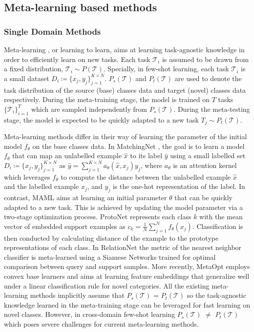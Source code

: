 \documentclass[runningheads]{llncs}
\begin{document}
\subsection{Meta-learning based methods}

\subsubsection{Single Domain Methods}
Meta-learning \cite{finn2017model,ravi2016optimization}, or learning to learn, aims at learning task-agnostic knowledge in order to efficiently learn on new tasks. Each task $\mathcal{T}_i$ is assumed to be drawn from a fixed distribution, $\mathcal{T}_i \sim P(\mathcal{T})$. Specially, in few-shot learning, each task $\mathcal{T}_i$ is a small dataset $D_i \coloneqq \{x_j, y_j\}_{j=1}^{K \times N}$. $P_s(\mathcal{T})$ and $P_t(\mathcal{T})$ are used to denote the task distribution of the source (base) classes data and target (novel) classes data respectively. During the meta-training stage, the model is trained on $T$ tasks $\{\mathcal{T}_i\}_{i=1}^T$ which are sampled independently from $P_s(\mathcal{T})$. During the meta-testing stage, the model is expected to be quickly adapted to a new task ${T}_j \sim P_t(\mathcal{T})$.

Meta-learning methods differ in their way of learning the parameter of the initial model $f_\theta$ on the base classes data. In MatchingNet \cite{vinyals2016matching}, the goal is to learn a model $f_\theta$ that can map an unlabelled example $\hat{x}$ to its label $\hat{y}$ using a small labelled set $D_i \coloneqq \{x_j, y_j\}_{j=1}^{K \times N}$ as $\hat{y} = \sum_{j=1}^{K \times N}a_\theta(\hat{x}, x_j)y_j$, where $a_\theta$ is an attention kernel which leverages $f_\theta$ to compute the distance between the unlabelled example $\hat{x}$ and the labelled example $x_j$, and $y_j$ is the one-hot representation of the label. In contrast, MAML \cite{finn2017model} aims at learning an initial parameter $\theta$ that can be quickly adapted to a new task. This is achieved by updating the model parameter via a two-stage optimization process. ProtoNet \cite{snell2017prototypical} represents each class $k$ with the mean vector of embedded support examples as $c_k = \frac{1}{N} \sum_{j=1}^{N}f_\theta(x_j)$. Classification is then conducted by calculating distance of the example to the prototype representations of each class. In RelationNet \cite{sung2018learning} the metric of the nearest neighbor classifier is meta-learned using a Siamese Networks trained for optimal comparison between query and support samples. More recently, MetaOpt \cite{lee2019meta} employs convex base learners and aims at learning feature embeddings that generalize well under a linear classification rule for novel categories. All the existing meta-learning methods implicitly assume that $P_s(\mathcal{T})$ = $P_t(\mathcal{T})$ so the task-agnostic knowledge learned in the meta-training stage can be leveraged for fast learning on novel classes. However, in cross-domain few-shot learning $P_s(\mathcal{T})$ $\neq$ $P_t(\mathcal{T})$ which poses severe challenges for current meta-learning methods.
\end{document}
